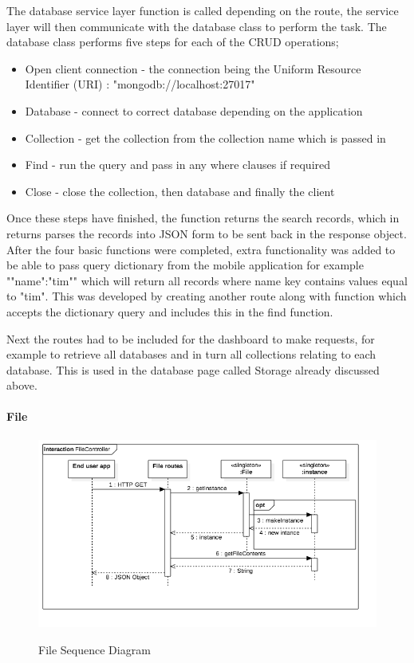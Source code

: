 The database service layer function is called depending on the route, the service layer will then communicate with the database class to perform the task. The database class performs five steps for each of the CRUD operations;

\begin{itemize}
  \item Open client connection
  - the connection being the Uniform Resource Identifier (URI) : "mongodb://localhost:27017" 
  \item Database 
  - connect to correct database depending on the application
  \item Collection
  - get the collection from the collection name which is passed in
  \item Find
  - run the query and pass in any where clauses if required
  \item Close
  - close the collection, then database and finally the client
\end{itemize}

Once these steps have finished, the function returns the search records, which in returns parses the records into JSON form to be sent back in the response object. After the four basic functions were completed, extra functionality was added to be able to pass query dictionary from the mobile application for example "{"name":"tim"}" which will return all records where name key contains values equal to "tim". This was developed by creating another route along with function which accepts the dictionary query and includes this in the find function.

Next the routes had to be included for the dashboard to make requests, for example to retrieve all databases and in turn all collections relating to each database. This is used in the database page called Storage already discussed above. 

\paragraph{File}

\begin{figure}[!h]
    \caption{File Sequence Diagram}
    \centering
    \includegraphics[width=150mm]{images/sequence/FileController}
    \label{fig:file-seq}
\end{figure}

